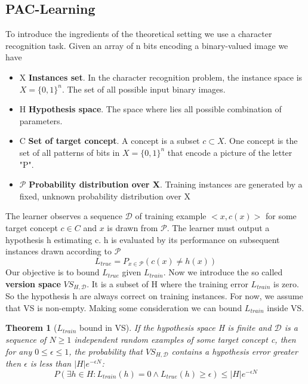 \documentclass[main.tex]{subfiles}
\newtheorem{theorem}{Theorem}[section] %
\begin{document}
\subsection{PAC-Learning}
To introduce the ingredients of the theoretical setting we use a character recognition task. Given an array of n bits encoding a binary-valued image we have
\begin{itemize}
    \item X \textbf{Instances set}. In the character recognition problem, the instance space is $X=\{0,1\}^{n}$. The set of all possible input binary images.
    \item H \textbf{Hypothesis space}. The space where lies all possible combination of parameters.
    \item C \textbf{Set of target concept}. A concept is a subset $c\subset X$. One concept is the set of all patterns of bits in  $X=\{0,1\}^{n}$ that encode a picture of the letter "P".
    \item $\mathcal{P}$ \textbf{Probability distribution over X}. Training instances are generated by a fixed, unknown probability distribution over X
\end{itemize}
The learner observes a sequence $\mathcal{D}$ of training example $<x,c(x)>$ for some target concept $c \in C$ and $x$ is drawn from $\mathcal{P}$. The learner must output a hypothesis h estimating c. h is evaluated by its performance on subsequent instances drawn according to $\mathcal{P}$
\begin{equation*}
    L_{true} = P_{x \in \mathcal{P}}(c(x) \neq h(x))
\end{equation*}
Our objective is to bound $L_{true}$ given $L_{train}$.
Now we introduce the so called \textbf{version space} $VS_{H,\mathcal{D}}$. It is a subset of H where the training error $L_{train}$ is zero. So the hypothesis h are always correct on training instances. For now, we assume that VS is non-empty. Making some consideration we can bound $L_{train}$ inside VS.
\begin{theorem}[$L_{train}$ bound in VS]
If the hypothesis space H is finite and $\mathcal{D}$ is a sequence of $N \geq 1$ independent random examples of some target concept c, then for any $0 \leq \epsilon \leq 1$, the probability that $VS_{H,\mathcal{D}}$ contains a hypothesis error greater then $\epsilon$ is less than $|H|e^{−\epsilon N}$:
\begin{equation*}
    P(\exists h \in H: L_{train}(h)=0 \land L_{true}(h) \geq \epsilon) \leq |H|e^{−\epsilon N}
\end{equation*}
\end{theorem}
\end{document}
